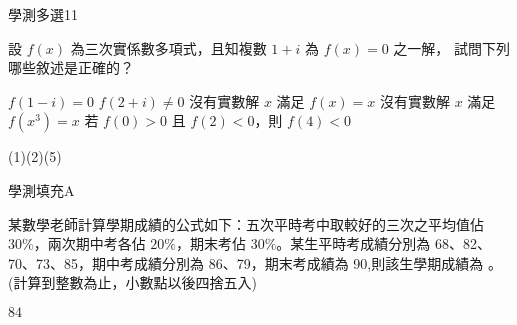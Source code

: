     \begin{QUESTION}
        \begin{ExamInfo}{93}{學測}{多選}{11}
        \end{ExamInfo}
        \begin{ExamAnsRateInfo}{29}{55}{23}{9}
        \end{ExamAnsRateInfo}
        \begin{QBODY}
            設 $f(x)$ 為三次實係數多項式，且知複數 $1+i$ 為 $f(x)=0$ 之一解，
            試問下列哪些敘述是正確的？
            \begin{QOPS} 
                \QOP $f(1-i)=0$ \quad 
                \QOP $f(2+i) \neq 0$ 
                \QOP 沒有實數解 $x$ 滿足 $f(x)=x$ 
                \QOP 沒有實數解 $x$ 滿足 $f(x^3)=x$ 
                \QOP 若 $f(0)>0$ 且 $f(2) <0$，則 $f(4)<0$ 
            \end{QOPS}
        \end{QBODY}
        \begin{QFROMS}
        \end{QFROMS}
        \begin{QTAGS}\end{QTAGS}
        \begin{QANS}
            (1)(2)(5)
        \end{QANS}
        \begin{QSOLLIST}
        \end{QSOLLIST}
        \begin{QEMPTYSPACE}
        \end{QEMPTYSPACE}
    \end{QUESTION}
    \begin{QUESTION}
        \begin{ExamInfo}{93}{學測}{填充}{A}
        \end{ExamInfo}
        \begin{ExamAnsRateInfo}{70}{90}{77}{43}
        \end{ExamAnsRateInfo}
        \begin{QBODY}
            某數學老師計算學期成績的公式如下：五次平時考中取較好的三次之平均值佔 $30\%$，兩次期中考各佔 $20\%$，期末考佔 $30\%$。某生平時考成績分別為 68、82、70、73、85，期中考成績分別為 86、79，期末考成績為 90,則該生學期成績為 
            \TCNBOX{\TCN\TCN}。(計算到整數為止，小數點以後四捨五入)
        \end{QBODY}
        \begin{QFROMS}
        \end{QFROMS}
        \begin{QTAGS}\end{QTAGS}
        \begin{QANS}
            $84$
        \end{QANS}
        \begin{QSOLLIST}
        \end{QSOLLIST}
        \begin{QEMPTYSPACE}
        \end{QEMPTYSPACE}
    \end{QUESTION}
